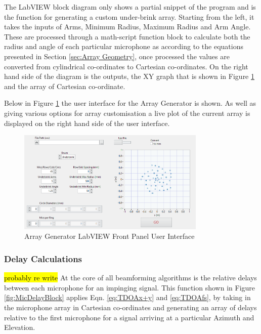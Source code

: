 \documentclass{UoNMCHA}
\numberwithin{equation}{section}
\begin{document}
    The LabVIEW block diagram only shows a partial snippet of the program and is the function for generating a custom under-brink array. Starting from the left, it takes the inputs of Arms, Minimum Radius, Maximum Radius and Arm Angle. These are processed through a math-script function block to calculate both the radius and angle of each particular microphone as according to the equations presented in Section \ref{sec:Array Geometry}, once processed the values are converted from cylindrical co-ordinates to Cartesian co-ordinates. On the right hand side of the diagram is the outputs, the XY graph that is shown in Figure \ref{fig:ArrayGenPanel} and the array of Cartesian co-ordinate.
    
    Below in Figure \ref{fig:ArrayGenPanel} the user interface for the Array Generator is shown. As well as giving various options for array customisation a live plot of the current array is displayed on the right hand side of the user interface.  
    
    \begin{figure}[H]
        \centering
        \includegraphics[keepaspectratio, width = 0.8\textwidth]{Figures/ArrayGenPanel.png}
        \caption{Array Generator LabVIEW Front Panel User Interface}
        \label{fig:ArrayGenPanel}
    \end{figure}
    
\subsubsection{Delay Calculations} \label{sec:Delay Calculations}
    \hl{probably re write}
    At the core of all beamforming algorithms is the relative delays between each microphone for an impinging signal. This function shown in Figure \ref{fig:MicDelayBlock} applies Eqn. \ref{eq:TDOAx+y} and \ref{eq:TDOAfs}, by taking in the microphone array in Cartesian co-ordinates and generating an array of delays relative to the first microphone for a signal arriving at a particular Azimuth and Elevation.
    
\end{document}
